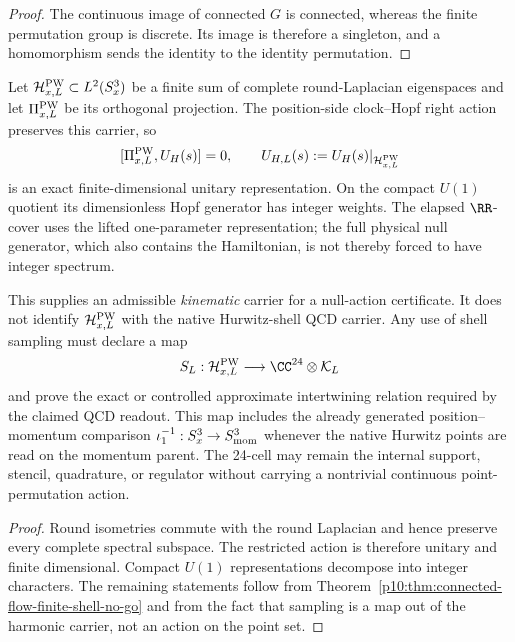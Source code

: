 \documentclass[12pt,a4paper]{article}
\begin{document}
\begin{proof}
The continuous image of connected \(G\) is connected, whereas the finite
permutation group is discrete.  Its image is therefore a singleton, and a
homomorphism sends the identity to the identity permutation.
\end{proof}

\begin{corollary}
\label{p10:cor:harmonic-null-action-shell-boundary}
Let \(\mathcal H_{x,L}^{\rm PW}\subset L^2(S_x^3)\) be a finite sum of
complete round-Laplacian eigenspaces and let \(\Pi_{x,L}^{\rm PW}\) be its
orthogonal projection.  The position-side clock--Hopf right action preserves
this carrier, so
\[
 [\Pi_{x,L}^{\rm PW},U_H(s)]=0,
 \qquad
 U_{H,L}(s):=U_H(s)|_{\mathcal H_{x,L}^{\rm PW}}
\]
is an exact finite-dimensional unitary representation.  On the compact
\(U(1)\) quotient its dimensionless Hopf generator has integer weights.  The
elapsed \(\RR\)-cover uses the lifted one-parameter representation; the full
physical null generator, which also contains the Hamiltonian, is not thereby
forced to have integer spectrum.

This supplies an admissible \emph{kinematic} carrier for a null-action
certificate.  It does not identify \(\mathcal H_{x,L}^{\rm PW}\) with the native
Hurwitz-shell QCD carrier.  Any use of shell sampling must declare a map
\[
 S_L:\mathcal H_{x,L}^{\rm PW}\longrightarrow
 \CC^{24}\otimes\mathcal K_L
\]
and prove the exact or controlled approximate intertwining relation required
by the claimed QCD readout.  This map includes the already generated
position--momentum comparison \(\iota_1^{-1}:S_x^3\to S^3_{\rm mom}\) whenever
the native Hurwitz points are read on the momentum parent.  The 24-cell may
remain the internal support,
stencil, quadrature, or regulator without carrying a nontrivial continuous
point-permutation action.
\end{corollary}

\begin{proof}
Round isometries commute with the round Laplacian and hence preserve every
complete spectral subspace.  The restricted action is therefore unitary and
finite dimensional.  Compact \(U(1)\) representations decompose into integer
characters.  The remaining statements follow from
Theorem~\ref{p10:thm:connected-flow-finite-shell-no-go} and from the fact that
sampling is a map out of the harmonic carrier, not an action on the point
set.
\end{proof}
\end{document}
